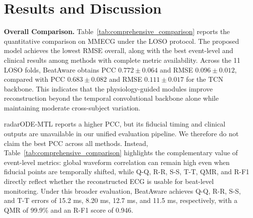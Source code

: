 \documentclass[runningheads]{llncs}
\begin{document}
\section{Results and Discussion}
\vspace{-0.6em}

\noindent\textbf{Overall Comparison.}
Table~\ref{tab:comprehensive_comparison} reports the quantitative comparison on MMECG under the LOSO protocol. The proposed model achieves the lowest RMSE overall, along with the best event-level and clinical results among methods with complete metric availability. Across the 11 LOSO folds, BeatAware obtains PCC $0.772\pm0.064$ and RMSE $0.096\pm0.012$, compared with PCC $0.683\pm0.082$ and RMSE $0.111\pm0.017$ for the TCN backbone. This indicates that the physiology-guided modules improve reconstruction beyond the temporal convolutional backbone alone while maintaining moderate cross-subject variation.

radarODE-MTL reports a higher PCC, but its fiducial timing and clinical outputs are unavailable in our unified evaluation pipeline. We therefore do not claim the best PCC across all methods. Instead, Table~\ref{tab:comprehensive_comparison} highlights the complementary value of event-level metrics: global waveform correlation can remain high even when fiducial points are temporally shifted, while Q-Q, R-R, S-S, T-T, QMR, and R-F1 directly reflect whether the reconstructed ECG is usable for beat-level monitoring. Under this broader evaluation, BeatAware achieves Q-Q, R-R, S-S, and T-T errors of 15.2 ms, 8.20 ms, 12.7 ms, and 11.5 ms, respectively, with a QMR of 99.9\% and an R-F1 score of 0.946.
\end{document}
